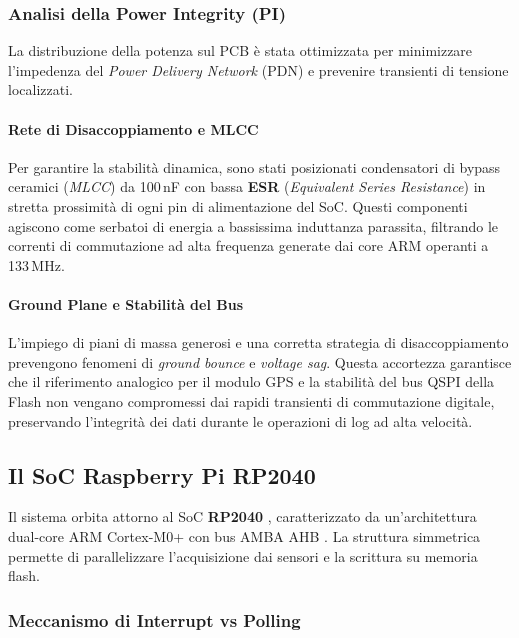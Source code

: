 \subsubsection*{Analisi della Power Integrity (PI)}

La distribuzione della potenza sul PCB è stata ottimizzata per minimizzare l'impedenza del \textit{Power Delivery Network} (PDN) e prevenire transienti di tensione localizzati.

\paragraph{Rete di Disaccoppiamento e MLCC}
Per garantire la stabilità dinamica, sono stati posizionati condensatori di bypass ceramici (\textit{MLCC}) da 100\,nF con bassa \textbf{ESR} (\textit{Equivalent Series Resistance}) in stretta prossimità di ogni pin di alimentazione del SoC. Questi componenti agiscono come serbatoi di energia a bassissima induttanza parassita, filtrando le correnti di commutazione ad alta frequenza generate dai core ARM operanti a 133\,MHz.



\paragraph{Ground Plane e Stabilità del Bus}
L'impiego di piani di massa generosi e una corretta strategia di disaccoppiamento prevengono fenomeni di \textit{ground bounce} e \textit{voltage sag}. Questa accortezza garantisce che il riferimento analogico per il modulo GPS e la stabilità del bus QSPI della Flash non vengano compromessi dai rapidi transienti di commutazione digitale, preservando l'integrità dei dati durante le operazioni di log ad alta velocità.


\subsection{Il SoC Raspberry Pi RP2040}
Il sistema orbita attorno al SoC \textbf{RP2040} \cite{rp2040_ds}, caratterizzato da un'architettura dual-core ARM Cortex-M0+ con bus AMBA AHB \cite{rp2040_ds}. La struttura simmetrica permette di parallelizzare l'acquisizione dai sensori e la scrittura su memoria flash.

\subsubsection*{Meccanismo di Interrupt vs Polling}

